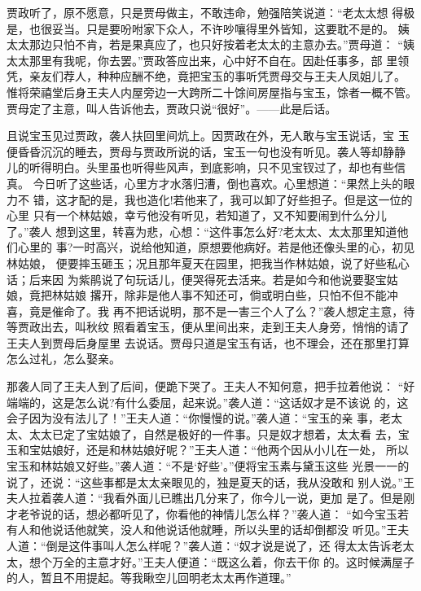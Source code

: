 贾政听了，原不愿意，只是贾母做主，不敢违命，勉强陪笑说道：“老太太想
得极是，也很妥当。只是要吩咐家下众人，不许吵嚷得里外皆知，这要耽不是的。
姨太太那边只怕不肯，若是果真应了，也只好按着老太太的主意办去。”贾母道：
“姨太太那里有我呢，你去罢。”贾政答应出来，心中好不自在。因赴任事多，部
里领凭，亲友们荐人，种种应酬不绝，竟把宝玉的事听凭贾母交与王夫人凤姐儿了。
惟将荣禧堂后身王夫人内屋旁边一大跨所二十馀间房屋指与宝玉，馀者一概不管。
贾母定了主意，叫人告诉他去，贾政只说“很好”。——此是后话。

且说宝玉见过贾政，袭人扶回里间炕上。因贾政在外，无人敢与宝玉说话，宝
玉便昏昏沉沉的睡去，贾母与贾政所说的话，宝玉一句也没有听见。袭人等却静静
儿的听得明白。头里虽也听得些风声，到底影响，只不见宝钗过了，却也有些信真。
今日听了这些话，心里方才水落归漕，倒也喜欢。心里想道：“果然上头的眼力不
错，这才配的是，我也造化!若他来了，我可以卸了好些担子。但是这一位的心里
只有一个林姑娘，幸亏他没有听见，若知道了，又不知要闹到什么分儿了。”袭人
想到这里，转喜为悲，心想：“这件事怎么好?老太太、太太那里知道他们心里的
事?一时高兴，说给他知道，原想要他病好。若是他还像头里的心，初见林姑娘，
便要摔玉砸玉；况且那年夏天在园里，把我当作林姑娘，说了好些私心话；后来因
为紫鹃说了句玩话儿，便哭得死去活来。若是如今和他说要娶宝姑娘，竟把林姑娘
撂开，除非是他人事不知还可，倘或明白些，只怕不但不能冲喜，竟是催命了。我
再不把话说明，那不是一害三个人了么？”袭人想定主意，待等贾政出去，叫秋纹
照看着宝玉，便从里间出来，走到王夫人身旁，悄悄的请了王夫人到贾母后身屋里
去说话。贾母只道是宝玉有话，也不理会，还在那里打算怎么过礼，怎么娶亲。

那袭人同了王夫人到了后间，便跪下哭了。王夫人不知何意，把手拉着他说：
“好端端的，这是怎么说?有什么委屈，起来说。”袭人道：“这话奴才是不该说
的，这会子因为没有法儿了！”王夫人道：“你慢慢的说。”袭人道：“宝玉的亲
事，老太太、太太已定了宝姑娘了，自然是极好的一件事。只是奴才想着，太太看
去，宝玉和宝姑娘好，还是和林姑娘好呢？”王夫人道：“他两个因从小儿在一处，
所以宝玉和林姑娘又好些。”袭人道：“不是‘好些’。”便将宝玉素与黛玉这些
光景一一的说了，还说：“这些事都是太太亲眼见的，独是夏天的话，我从没敢和
别人说。”王夫人拉着袭人道：“我看外面儿已瞧出几分来了，你今儿一说，更加
是了。但是刚才老爷说的话，想必都听见了，你看他的神情儿怎么样？”袭人道：
“如今宝玉若有人和他说话他就笑，没人和他说话他就睡，所以头里的话却倒都没
听见。”王夫人道：“倒是这件事叫人怎么样呢？”袭人道：“奴才说是说了，还
得太太告诉老太太，想个万全的主意才好。”王夫人便道：“既这么着，你去干你
的。这时候满屋子的人，暂且不用提起。等我瞅空儿回明老太太再作道理。”

